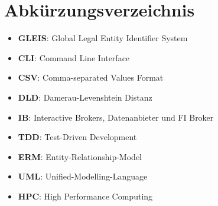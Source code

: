 \section{Abkürzungsverzeichnis}
\begin{itemize}
	\item \textbf{GLEIS}: Global Legal Entity Identifier System
    \item \textbf{CLI}: Command Line Interface
    \item \textbf{CSV}: Comma-separated Values Format
    \item \textbf{DLD}: Damerau-Levenshtein Distanz
    \item \textbf{IB}: Interactive Brokers, Datenanbieter und FI Broker
    \item \textbf{TDD}: Test-Driven Development
    \item \textbf{ERM}: Entity-Relationship-Model
    \item \textbf{UML}: Unified-Modelling-Language
    \item \textbf{HPC}: High Performance Computing
\end{itemize}